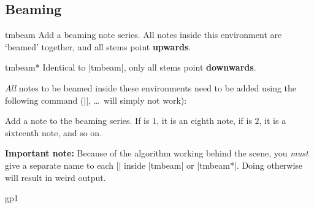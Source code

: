 \subsection{Beaming}\label{sec:music-notes:beam}
\begin{environment}{{tmbeam}}
  Add a beaming note series. All notes inside this environment are `beamed' 
  together, and all stems point {\bfseries upwards}.
\end{environment}
\begin{environment}{{tmbeam*}}
  Identical to |{tmbeam}|, only all stems point {\bfseries downwards}.
\end{environment}
\emph{All} notes to be beamed inside these environments need to be added using 
the following command (|\tmeighth|, \dots\ will simply not work):
\begin{command}{\tmbeamnote{}}
  Add a note to the beaming series. If  is $1$, it is an 
  eighth note, if  is $2$, it is a sixteenth note, and so 
  on.
\end{command}
{\bfseries\sffamily Important note:} Because of the algorithm working 
behind the scene, you \emph{must} give a separate name to each |\tmbeamnote| 
inside |{tmbeam}| or |{tmbeam*}|. Doing otherwise will result in 
weird output.
\begin{codeexample}[]
\begin{tmline}%
\begin{tmstaff}{g}{p1}
  \begin{tmbeam*}
  \end{tmbeam*}
  \begin{tmbeam*}
  \end{tmbeam*}
  \begin{tmbeam}
  \end{tmbeam}
  \begin{tmbeam}
  \end{tmbeam}
\end{tmstaff}%
%
\end{tmline}
\end{codeexample}

